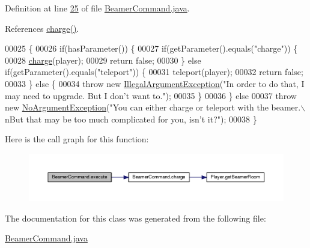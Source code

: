 Definition at line \hyperlink{BeamerCommand_8java_source_l00025}{25} of file \hyperlink{BeamerCommand_8java_source}{Beamer\-Command.\-java}.



References \hyperlink{BeamerCommand_8java_source_l00062}{charge()}.


\begin{DoxyCode}
00025                                                                                                            
               \{
00026         \textcolor{keywordflow}{if}(hasParameter()) \{
00027             \textcolor{keywordflow}{if}(getParameter().equals(\textcolor{stringliteral}{"charge"})) \{
00028                 \hyperlink{classBeamerCommand_a130a572b2ec0532c92ea5033a098b1ac}{charge}(player);
00029                 \textcolor{keywordflow}{return} \textcolor{keyword}{false};
00030             \} \textcolor{keywordflow}{else} \textcolor{keywordflow}{if}(getParameter().equals(\textcolor{stringliteral}{"teleport"})) \{
00031                 teleport(player);
00032                 \textcolor{keywordflow}{return} \textcolor{keyword}{false};
00033             \} \textcolor{keywordflow}{else} \{
00034                 \textcolor{keywordflow}{throw} \textcolor{keyword}{new} \hyperlink{classIllegalArgumentException}{IllegalArgumentException}(\textcolor{stringliteral}{"In order to do that, I may need
       to upgrade. But I don't want to."});
00035             \}
00036         \} \textcolor{keywordflow}{else} 
00037             \textcolor{keywordflow}{throw} \textcolor{keyword}{new} \hyperlink{classNoArgumentException}{NoArgumentException}(\textcolor{stringliteral}{"You can either charge or teleport with the
       beamer.\(\backslash\)nBut that may be too much complicated for you, isn't it?"});
00038     \}
\end{DoxyCode}


Here is the call graph for this function\-:
\nopagebreak
\begin{figure}[H]
\begin{center}
\leavevmode
\includegraphics[width=350pt]{classBeamerCommand_ab28a7d743569841e463b2c0c65cf6eb1_cgraph}
\end{center}
\end{figure}




The documentation for this class was generated from the following file\-:\begin{DoxyCompactItemize}
\item 
\hyperlink{BeamerCommand_8java}{Beamer\-Command.\-java}\end{DoxyCompactItemize}
